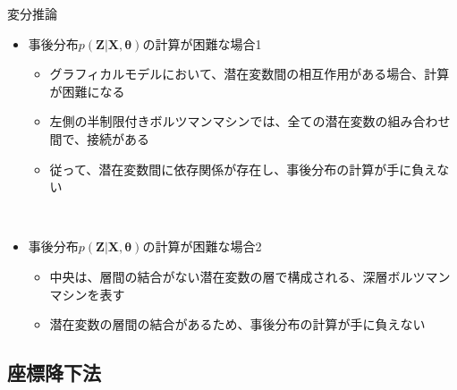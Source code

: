 \documentclass[dvipdfmx,notheorems,t]{beamer}
\begin{document}
\begin{frame}{変分推論}

\begin{itemize}
	\item 事後分布$p(\bm{Z} | \bm{X}, \bm{\theta})$の計算が困難な場合1
	\begin{itemize}
		\item グラフィカルモデルにおいて、\alert{潜在変数間の相互作用がある}場合、計算が困難になる
		\newline
		\item 左側の\alert{半制限付きボルツマンマシン}では、全ての潜在変数の組み合わせ間で、接続がある
		\item 従って、潜在変数間に\alert{依存関係}が存在し、事後分布の計算が手に負えない
	\end{itemize} \
	
	\item 事後分布$p(\bm{Z} | \bm{X}, \bm{\theta})$の計算が困難な場合2
	\begin{itemize}
		\item 中央は、層間の結合がない潜在変数の層で構成される、\alert{深層ボルツマンマシン}を表す
		\item 潜在変数の層間の結合があるため、事後分布の計算が手に負えない
	\end{itemize}
\end{itemize}

\end{frame}

\subsection{座標降下法}
\end{document}
